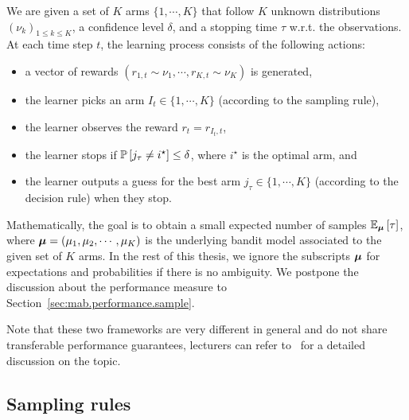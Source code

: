 \begin{definition}\label{def:mab.bai_confidence}
\begin{leftbar}[defnbar]
	We are given a set of $K$ arms $\{1,\cdots,K\}$ that follow $K$ unknown distributions $(\nu_k)_{1 \leq k \leq K}$, a confidence level $\delta$, and a stopping time $\tau$ w.r.t. the observations. At each time step $t$, the learning process consists of the following actions:
\begin{itemize}
	\item a vector of rewards $(r_{1,t} \sim \nu_1, \cdots, r_{K,t} \sim \nu_K)$ is generated,
	\item the learner picks an arm $I_t \in \{1,\cdots,K\}$ (according to the sampling rule),
	\item the learner observes the reward $r_t = r_{I_t, t}$,
	\item the learner stops if $\mathbb{P}\left[j_{\tau}\neq i^{\star}\right] \leq \delta$, where $i^{\star}$ is the optimal arm, and
	\item the learner outputs a guess for the best arm $j_\tau \in \{1,\cdots,K\}$ (according to the decision rule) when they stop.
\end{itemize}
\end{leftbar}
\end{definition}

Mathematically, the goal is to obtain a small expected number of samples $\mathbb{E}_{{\boldsymbol \mu}}\left[\tau\right]$, where ${\boldsymbol \mu}=(\mu_1,\mu_2,\cdots,\mu_K)$ is the underlying bandit model associated to the given set of $K$ arms. In the rest of this thesis, we ignore the subscripts ${\boldsymbol \mu}$ for expectations and probabilities if there is no ambiguity. We postpone the discussion about the performance measure to Section~\ref{sec:mab.performance.sample}.

\begin{remark}
\begin{leftbar}[remarkbar]
Note that these two frameworks are very different in general and do not share transferable performance guarantees, lecturers can refer to~\cite{carpentier2016budget} for a detailed discussion on the topic.
\end{leftbar}
\end{remark}

\subsection{Sampling rules}\label{sec:mab.bai.sampling}


